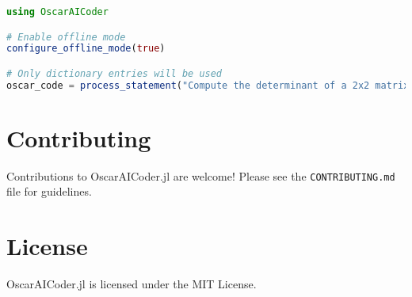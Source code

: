 \documentclass[11pt,a4paper]{article}
\begin{document}
\begin{lstlisting}[language=Julia]
using OscarAICoder

# Enable offline mode
configure_offline_mode(true)

# Only dictionary entries will be used
oscar_code = process_statement("Compute the determinant of a 2x2 matrix")
\end{lstlisting}

\section{Contributing}

Contributions to OscarAICoder.jl are welcome! Please see the \texttt{CONTRIBUTING.md} file for guidelines.

\section{License}

OscarAICoder.jl is licensed under the MIT License.
\end{document}

